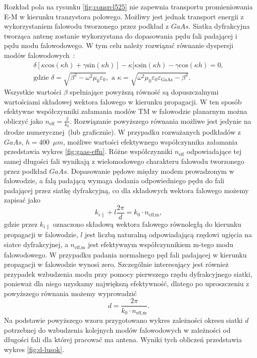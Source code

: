 Rozkład pola na rysunku \ref{fig:consrcl525} nie zapewnia transportu promieniowania E-M w kierunku tranzystora polowego. Możliwy jest jednak transport energii z wykorzystaniem falowodu tworzonego przez podkład z $GaAs$. Siatka dyfrakcyjna tworząca antenę zostanie wykorzystana do dopasowania pędu fali padającej i pędu modu falowodowego. W tym celu należy rozwiązać równanie dyspersji modów falowodowych~\cite{petykiewicz1989podstawy}:
\begin{equation}
	\begin{gathered}
	\delta [ \kappa \textrm{cos}(\kappa h) + \gamma\textrm{sin}(\kappa h) ] - \kappa [ \kappa \textrm{sin}(\kappa h) - \gamma \textrm{cos}(\kappa h) = 0,\\
	\textrm{gdzie }\delta=\sqrt{\beta^2-\omega^2\mu_0\varepsilon_0},\textrm{ a }\kappa=\sqrt{\omega^2\mu_0 \varepsilon_0 \varepsilon_{\textrm{GaAs}}-\beta^2}.
	\end{gathered}
\end{equation}
Wszystkie wartości $\beta$ spełniające powyższą równość są dopuszczalnymi wartościami składowej wektora falowego w kierunku propagacji. W ten sposób efektywne współczynniki załamania modów TM w falowodzie planarnym można obliczyć jako $n_{\textrm{eff}}=\frac{\beta}{k_0}$. Rozwiązanie powyższego równania możliwe jest jedynie na drodze numerycznej~(lub graficznie). W przypadku rozważanych podkładów z $GaAs$, $h=400$~$\mu m$, możliwe wartości efektywnego współczynnika załamania przedstawia wykres \ref{fig:gaas-effn}. Różne współczynniki $n_{\textrm{eff}}$ odpowiadające tej samej długości fali wynikają z wielomodowego charakteru falowodu tworzonego przez podkład $GaAs$. Dopasowanie pędowe między modem prowadzonym w falowodzie, a falą padającą wymaga dodania odpowiedniego pędu do fali padającej przez siatkę dyfrakcyjną, co dla składowych wektora falowego możemy zapisać jako
\[
k_{i \parallel} + l \frac{2\pi}{d} = k_0 \cdot n_{\textrm{eff,m}}, 
\]
gdzie przez $k_{i \parallel}$ oznaczono składową wektora falowego równoległą do kierunku propagacji w falowodzie, $l$ jest liczbą naturalną odpowiadającą rzędowi ugięcia na siatce dyfrakcyjnej, a $n_{\textrm{eff,m}}$ jest efektywnym współczynnikiem m-tego modu falowodowego. W przypadku padania normalnego pęd fali padającej w kierunku propagacji w falowodzie wynosi zero. Szczególnie interesujący jest również przypadek wzbudzenia modu przy pomocy pierwszego rzędu dyfrakcyjnego siatki, ponieważ dla niego uzyskamy największą efektywność, dlatego po uproszczeniu z powyższego równania możemy wyprowadzić
\begin{equation}
d=\frac{2 \pi}{k_0 \cdot n_{\textrm{eff,m}}}.
\label{eq:d-do-wzbudzenia}
\end{equation}
Na podstawie powyższego wzoru przygotowano wykres zależności okresu siatki $d$ potrzebnej do wzbudzenia kolejnych modów falowodowych w zależności od długości fali dla której pracować ma antena. Wyniki tych obliczeń przedstawia wykres \ref{fig:d-lusok}.

